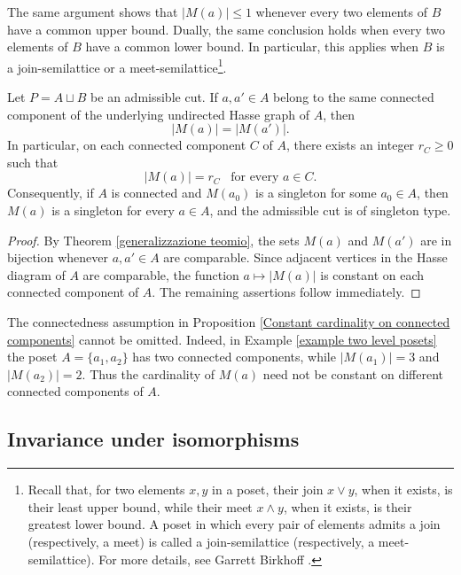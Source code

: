 \begin{remark}
    The same argument shows that $|M(a)| \leq 1$ whenever every two elements of $B$ have a common upper bound. Dually, the same conclusion holds when every two elements of $B$ have a common lower bound. In particular, this applies when $B$ is a join-semilattice or a meet-semilattice\footnote{Recall that, for two elements $x,y$ in a poset, their join $x\lor y$, when it exists, is their least upper bound, while their meet $x \land y$, when it exists, is their greatest lower bound. A poset in which every pair of elements admits a join (respectively, a meet) is called a join-semilattice (respectively, a meet-semilattice). For more details, see Garrett Birkhoff \cite[Chapter 1, page 9]{Birkhoff}.}.
\end{remark}

\begin{proposition}%
\label{Constant cardinality on connected components}
Let $P=A \sqcup B$ be an admissible cut. If $a, a' \in A$ belong to the same connected component of the underlying undirected Hasse graph of $A$, then \[|M(a)|=|M(a')|.\]
In particular, on each connected component $C$ of $A$, there exists an integer $r_C \geq0$ such that 
\[|M(a)|=r_C \,\,\, \text{ for every } a \in C.\]
Consequently, if $A$ is connected and $M(a_0)$ is a singleton for some $a_0 \in A$, then $M(a)$ is a singleton for every $a \in A$, and the admissible cut is of singleton type.
\end{proposition}
\begin{proof}
By Theorem \ref{generalizzazione teomio}, the sets $M(a)$ and $M(a')$ are in bijection whenever $a,a' \in A$ are comparable. Since adjacent vertices in the Hasse diagram of $A$ are comparable, the function $a \mapsto|M(a)|$ is constant on each connected component of $A$. The remaining assertions follow immediately.  
\end{proof}

\begin{remark}
    The connectedness assumption in Proposition \ref{Constant cardinality on connected components} cannot be omitted. Indeed, in Example \ref{example two level posets} the poset $A=\{a_1,a_2\}$ has two connected components, while $|M(a_1)|=3$ and $|M(a_2)|=2$. Thus the cardinality of $M(a)$ need not be constant on different connected components of $A$.
\end{remark}

\subsection{Invariance under isomorphisms}

